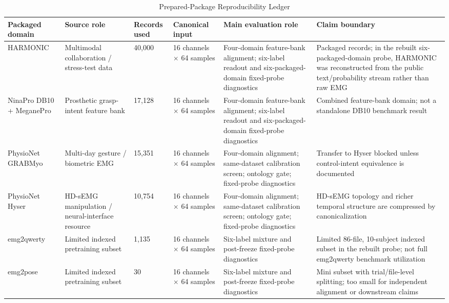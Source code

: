\documentclass[journal]{IEEEtran}
\begin{document}
\begin{table}[t]
\caption{Prepared-Package Reproducibility Ledger}
\label{tab:packagerepro}
\centering
\footnotesize
\begin{tabularx}{\textwidth}{@{}p{2.35cm}p{2.25cm}p{1.65cm}p{2.15cm}p{2.65cm}Y@{}}
\toprule
Packaged domain & Source role & Records used & Canonical input & Main evaluation role & Claim boundary \\
\midrule
HARMONIC & Multimodal collaboration / stress-test data & 40{,}000 & 16 channels $\times$ 64 samples & Four-domain feature-bank alignment; six-label readout and six-packaged-domain fixed-probe diagnostics & Packaged records; in the rebuilt six-packaged-domain probe, HARMONIC was reconstructed from the public text/probability stream rather than raw EMG \\
NinaPro DB10 + MeganePro & Prosthetic grasp-intent feature bank & 17{,}128 & 16 channels $\times$ 64 samples & Four-domain feature-bank alignment; six-label readout and six-packaged-domain fixed-probe diagnostics & Combined feature-bank domain; not a standalone DB10 benchmark result \\
PhysioNet GRABMyo & Multi-day gesture / biometric EMG & 15{,}351 & 16 channels $\times$ 64 samples & Four-domain alignment; same-dataset calibration screen; ontology gate; fixed-probe diagnostics & Transfer to Hyser blocked unless control-intent equivalence is documented \\
PhysioNet Hyser & HD-sEMG manipulation / neural-interface resource & 10{,}754 & 16 channels $\times$ 64 samples & Four-domain alignment; same-dataset calibration screen; ontology gate; fixed-probe diagnostics & HD-sEMG topology and richer temporal structure are compressed by canonicalization \\
emg2qwerty & Limited indexed pretraining subset & 1{,}135 & 16 channels $\times$ 64 samples & Six-label mixture and post-freeze fixed-probe diagnostics & Limited 86-file, 10-subject indexed subset in the rebuilt probe; not full emg2qwerty benchmark utilization \\
emg2pose & Limited indexed pretraining subset & 30 & 16 channels $\times$ 64 samples & Six-label mixture and post-freeze fixed-probe diagnostics & Mini subset with trial/file-level splitting; too small for independent alignment or downstream claims \\
\bottomrule
\end{tabularx}
\end{table}
\end{document}
